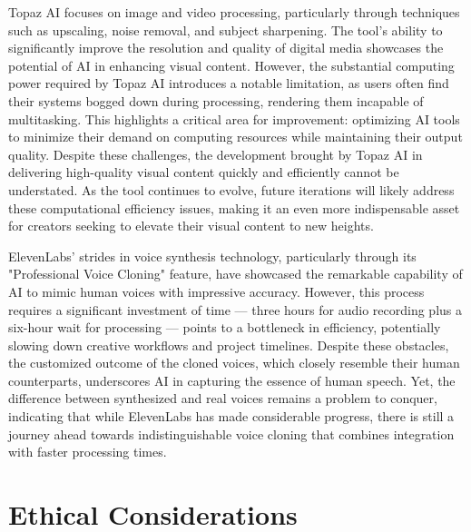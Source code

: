\documentclass[11pt,a4paper,oneside]{report}
\begin{document}
Topaz AI focuses on image and video processing, particularly through techniques such as upscaling, noise removal, and subject sharpening. 
The tool's ability to significantly improve the resolution and quality of digital media showcases the potential of AI in enhancing visual content. 
However, the substantial computing power required by Topaz AI introduces a notable limitation, as users often find their systems bogged down during processing, rendering them incapable of multitasking. 
This highlights a critical area for improvement: optimizing AI tools to minimize their demand on computing resources while maintaining their output quality. 
Despite these challenges, the development brought by Topaz AI in delivering high-quality visual content quickly and efficiently cannot be understated. 
As the tool continues to evolve, future iterations will likely address these computational efficiency issues, making it an even more indispensable asset for creators seeking to elevate their visual content to new heights.

ElevenLabs' strides in voice synthesis technology, particularly through its "Professional Voice Cloning" feature, have showcased the remarkable capability of AI to mimic human voices with impressive accuracy. 
However, this process requires a significant investment of time — three hours for audio recording plus a six-hour wait for processing — points to a bottleneck in efficiency, potentially slowing down creative workflows and project timelines. 
Despite these obstacles, the customized outcome of the cloned voices, which closely resemble their human counterparts, underscores AI in capturing the essence of human speech. 
Yet, the difference between synthesized and real voices remains a problem to conquer, indicating that while ElevenLabs has made considerable progress, there is still a journey ahead towards indistinguishable voice cloning that combines integration with faster processing times.

\section{Ethical Considerations}
\end{document}
